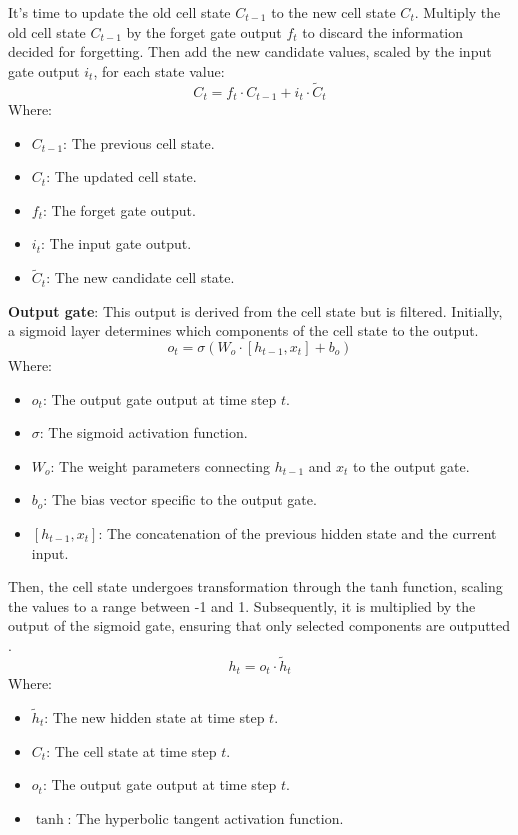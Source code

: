 \documentclass{ieeeojies}
\begin{document}
It's time to update the old cell state \( C_{t-1} \) to the new cell state \( C_t \). Multiply the old cell state \( C_{t-1} \) by the forget gate output \( f_t \) to discard the information decided for forgetting. Then add the new candidate values, scaled by the input gate output \( i_t \), for each state value:
\[
C_t = f_t \cdot C_{t-1} + i_t \cdot \tilde{C}_t
\]
Where:
\begin{itemize}
  \item \( C_{t-1} \): The previous cell state.
  \item \( C_t \): The updated cell state.
  \item \( f_t \): The forget gate output.
  \item \( i_t \): The input gate output.
  \item \( \tilde{C}_t \): The new candidate cell state.
\end{itemize}
\textbf{Output gate}: This output is derived from the cell state but is filtered. Initially, a sigmoid layer determines which components of the cell state to the output.
\[
o_t = \sigma(W_o \cdot [h_{t-1}, x_t] + b_o)
\]
Where:
\begin{itemize}
  \item \( o_t \): The output gate output at time step \( t \).
  \item \( \sigma \): The sigmoid activation function.
  \item \( W_o \): The weight parameters connecting \( h_{t-1} \) and \( x_t \) to the output gate.
  \item \( b_o \): The bias vector specific to the output gate.
  \item \( [h_{t-1}, x_t] \): The concatenation of the previous hidden state and the current input.
\end{itemize}
Then, the cell state undergoes transformation through the tanh function, scaling the values to a range between -1 and 1. Subsequently, it is multiplied by the output of the sigmoid gate, ensuring that only selected components are outputted \cite{b17}.
\[
h_t = o_t \cdot \tilde{h}_t
\]
Where:
\begin{itemize}
  \item \( \tilde{h}_t \): The new hidden state at time step \( t \).
  \item \( C_t \): The cell state at time step \( t \).
  \item \( o_t \): The output gate output at time step \( t \).
  \item \( \tanh \): The hyperbolic tangent activation function.
\end{itemize}
\end{document}
